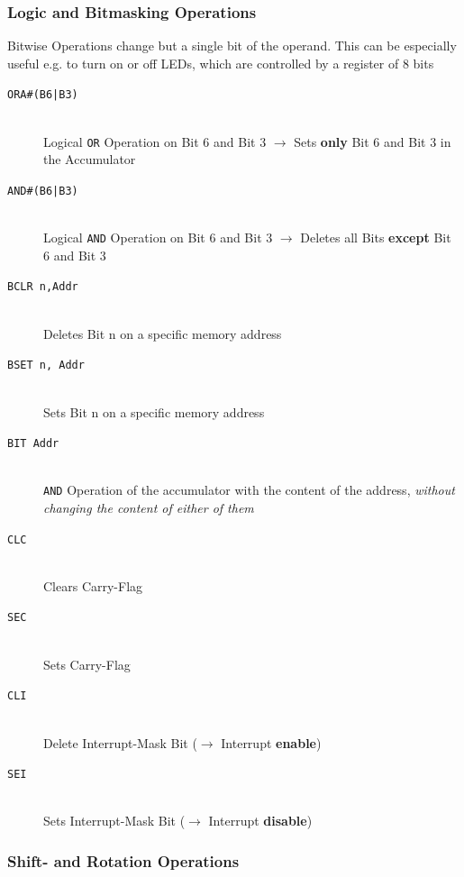 \documentclass[a4paper, 11pt, nofootinbib]{article}
\newcommand{\code}[1]{\texttt{#1}}
\begin{document}
\subsubsection{Logic and Bitmasking Operations}
Bitwise Operations change but a single bit of the operand. This can be especially useful e.g. to turn on or off LEDs, which are controlled by a register of 8 bits

\begin{description}
	\item[\code{ORA\#(B6|B3)}] \mbox{} \\
	Logical \code{OR} Operation on Bit 6 and Bit 3 $\rightarrow$ Sets \textbf{only} Bit 6 and Bit 3 in the Accumulator
	\item[\code{AND\#(B6|B3)}]\mbox{}\\
	Logical \code{AND} Operation on Bit 6 and Bit 3 $\rightarrow$ Deletes all Bits \textbf{except} Bit 6 and Bit 3
	\item[\code{BCLR n,Addr}] \mbox{}\\
	Deletes Bit n on a specific memory address
	\item[\code{BSET n, Addr}]\mbox{}\\
	Sets Bit n on a specific memory address
	\item[\code{BIT Addr}] \mbox{}\\
	\code{AND} Operation of the accumulator with the content of the address, \textit{without changing the content of either of them}
	\item[\code{CLC}] \mbox{}\\
	Clears Carry-Flag
	\item[\code{SEC}] \mbox{}\\
	Sets Carry-Flag
	\item[\code{CLI}] \mbox{}\\
	Delete Interrupt-Mask Bit ($\rightarrow$ Interrupt \textbf{enable})
	\item[\code{SEI}] \mbox{}\\
	Sets Interrupt-Mask Bit ($\rightarrow$ Interrupt \textbf{disable})
\end{description}

\subsubsection{Shift- and Rotation Operations}
\end{document}
